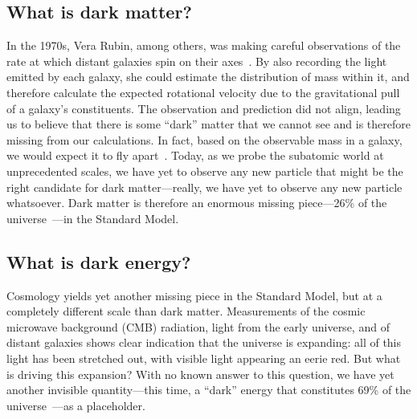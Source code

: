 \subsection{What is dark matter?}
In the 1970s, Vera Rubin, among others, was making careful observations of the rate at which distant galaxies spin on their axes~\cite{VeraRubin}.  
By also recording the light emitted by each galaxy, she could estimate the distribution of mass within it, and therefore calculate the expected rotational velocity due to the gravitational pull of a galaxy's constituents. 
The observation and prediction did not align, leading us to believe that there is some ``dark'' matter that we cannot see and is therefore missing from our calculations. 
In fact, based on the observable mass in a galaxy, we would expect it to fly apart~\cite{GalaxyDM}. 
Today, as we probe the subatomic world at unprecedented scales, we have yet to observe any new particle that might be the right candidate for dark matter---really, we have yet to observe any new particle whatsoever. 
Dark matter is therefore an enormous missing piece---26\% of the universe~\cite{PlanckDM}---in the Standard Model.

\subsection{What is dark energy?}
Cosmology yields yet another missing piece in the Standard Model, but at a completely different scale than dark matter. 
Measurements of the cosmic microwave background (CMB) radiation, light from the early universe, and of distant galaxies shows clear indication that the universe is expanding: all of this light has been stretched out, with visible light appearing an eerie red. %
But what is driving this expansion? 
With no known answer to this question, we have yet another invisible quantity---this time, a ``dark'' energy that constitutes 69\% of the universe~\cite{PlanckDM}---as a placeholder.

